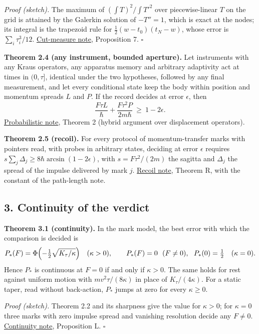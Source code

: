 \documentclass[11pt,a4paper]{article}
\begin{document}
\emph{Proof (sketch).} The maximum of \((\int T)^2/\int T'^2\) over
piecewise-linear \(T\) on the grid is attained by the Galerkin solution
of \(-T''=1\), which is exact at the nodes; its integral is the
trapezoid rule for \(\frac12(w-t_0)(t_N-w)\), whose error is
\(\sum_i\tau_i^3/12\). \href{cut-measure-newton.md}{Cut-measure note},
Proposition 7. \(\square\)

\textbf{Theorem 2.4 (any instrument, bounded aperture).} Let instruments
with any Kraus operators, any apparatus memory and arbitrary adaptivity
act at times in \((0,\tau]\), identical under the two hypotheses,
followed by any final measurement, and let every conditional state keep
the body within position and momentum spreads \(L\) and \(P\). If the
record decides at error \(\epsilon\), then
\[\frac{F\tau L}{\hbar}+\frac{F\tau^2P}{2m\hbar}\ \ge\ 1-2\epsilon .\]
\href{planck-gap-probabilistic.md}{Probabilistic note}, Theorem 2
(hybrid argument over displacement operators).

\textbf{Theorem 2.5 (recoil).} For every protocol of momentum-transfer
marks with pointers read, with probes in arbitrary states, deciding at
error \(\epsilon\) requires
\(s\sum_j\Delta_j\ge8\hbar\arcsin(1-2\epsilon)\), with
\(s=F\tau^2/(2m)\) the sagitta and \(\Delta_j\) the spread of the
impulse delivered by mark \(j\). \href{record-costs-recoil.md}{Recoil
note}, Theorem R, with the constant of the path-length note.

\hypertarget{continuity-of-the-verdict}{%
\subsection{3. Continuity of the
verdict}\label{continuity-of-the-verdict}}

\textbf{Theorem 3.1 (continuity).} In the mark model, the best error
with which the comparison is decided is
\[P_*(F)=\Phi\Bigl(-\tfrac12\sqrt{K_\tau/\kappa}\Bigr)\quad(\kappa>0),\qquad
P_*(F)=0\ \ (F\ne0),\ \ P_*(0)=\tfrac12\quad(\kappa=0).\] Hence \(P_*\)
is continuous at \(F=0\) if and only if \(\kappa>0\). The same holds for
rest against uniform motion with \(mv^2\tau/(8\kappa)\) in place of
\(K_\tau/(4\kappa)\). For a static taper, read without back-action,
\(P_*\) jumps at zero for every \(\kappa\ge0\).

\emph{Proof (sketch).} Theorem 2.2 and its sharpness give the value for
\(\kappa>0\); for \(\kappa=0\) three marks with zero impulse spread and
vanishing resolution decide any \(F\ne0\).
\href{leibniz-continuity-records.md}{Continuity note}, Proposition L.
\(\square\)
\end{document}

